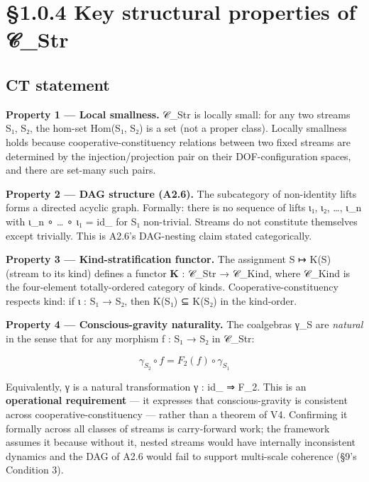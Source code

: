 \documentclass[11pt, openany]{book}
\newcommand{\sectionbreak}{\clearpage}
\begin{document}
\sectionbreak

\section{§1.0.4 Key structural properties of 𝒞\_\allowbreak{}Str}

\subsection{CT statement}

\textbf{Property 1 --- Local smallness.} 𝒞\_\allowbreak{}Str is locally small: for any two streams S₁, S₂, the hom-set Hom(S₁, S₂) is a set (not a proper class). Locally smallness holds because cooperative-constituency relations between two fixed streams are determined by the injection/projection pair on their DOF-configuration spaces, and there are set-many such pairs.

\textbf{Property 2 --- DAG structure (A2.6).} The subcategory of non-identity lifts forms a directed acyclic graph. Formally: there is no sequence of lifts ι₁, ι₂, …, ι\_\allowbreak{}n with ι\_\allowbreak{}n ∘ … ∘ ι₁ = id\_ for S₁ non-trivial. Streams do not constitute themselves except trivially. This is A2.6's DAG-nesting claim stated categorically.

\textbf{Property 3 --- Kind-stratification functor.} The assignment S ↦ K(S) (stream to its kind) defines a functor \textbf{K} : 𝒞\_\allowbreak{}Str → 𝒞\_\allowbreak{}Kind, where 𝒞\_\allowbreak{}Kind is the four-element totally-ordered category of kinds. Cooperative-constituency respects kind: if ι : S₁ → S₂, then K(S₁) ⊆ K(S₂) in the kind-order.

\textbf{Property 4 --- Conscious-gravity naturality.} The coalgebras γ\_\allowbreak{}S are \textit{natural} in the sense that for any morphism f : S₁ → S₂ in 𝒞\_\allowbreak{}Str:

$$\gamma_{S_2} \circ f = F_2(f) \circ \gamma_{S_1}$$

Equivalently, γ is a natural transformation γ : id\_ ⇒ F\_\allowbreak{}2. This is an \textbf{operational requirement} --- it expresses that conscious-gravity is consistent across cooperative-constituency --- rather than a theorem of V4. Confirming it formally across all classes of streams is carry-forward work; the framework assumes it because without it, nested streams would have internally inconsistent dynamics and the DAG of A2.6 would fail to support multi-scale coherence (§9's Condition 3).
\end{document}
